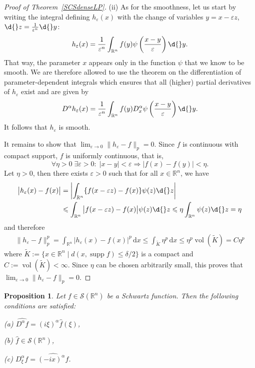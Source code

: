 \documentclass[12pt, oneside, a4paper]{article}
\newtheorem{prop}[thm]{Proposition}
\def\supp{\operatorname{supp}}
\theoremstyle{dfn}
\def \S {\ensuremath{\mathcal{S}}}
\def \S {\ensuremath{\mathcal{S}}}
\def\Rbb{\ensuremath{\mathbb{R}}}
\def\dx{\,\mathrm dx}
\providecommand{\norm}[1]{\lVert#1\rVert}
\providecommand{\abs}[1]{\lvert#1\rvert}
\providecommand{\absbig}[1]{\big\lvert#1\big\rvert}
\providecommand{\Abs}[1]{\left\lvert#1\right\rvert}
\begin{document}
\begin{proof}[Proof of Theorem~\ref{SCSdenseLP}]
(ii) As for the smoothness, let us start by writing the integral defining $h_\varepsilon(x)$ with the change of variables $y = x - \varepsilon z$, $\d{}z = \frac{1}{\varepsilon^n} \d{}y$:
\[
h_\varepsilon(x)
= \frac{1}{\varepsilon^n} \int_{\Rbb^n} f(y) \psi\left(\frac{x-y}{\varepsilon}\right) \d{}y.
\]
That way, the parameter $x$ appears only in the function $\psi$ that we know to be smooth. We are therefore allowed to use the theorem on the differentiation of parameter-dependent integrals which ensures that all (higher) partial derivatives of $h_\varepsilon$ exist and are given by
\[
D^\alpha h_\varepsilon(x)
= \frac{1}{\varepsilon^n} \int_{\Rbb^n} f(y) D^\alpha_x \psi\left(\frac{x-y}{\varepsilon}\right) \d{}y.
\]
It follows that $h_\varepsilon$ is smooth.

It remains to show that $\lim_{\varepsilon \to 0} \norm{h_\varepsilon - f}_p = 0$. Since $f$ is continuous with compact support, $f$ is uniformly continuous, that is,
\[
\forall \eta > 0 \; \exists \varepsilon > 0: \; \abs{x-y} < \varepsilon \Rightarrow \abs{f(x) - f(y)} < \eta.
\]
Let $\eta > 0$, then there exists $\varepsilon > 0$ such that for all $x \in \Rbb^n$, we have
\begin{align*}
	\absbig{h_\varepsilon(x) - f(x)}
	&= \Abs{\int_{\Rbb^n} \{f(x - \varepsilon z) - f(x)\} \psi(z) \d{}z} \\
	&\leqslant \int_{\Rbb^n} \absbig{f(x - \varepsilon z) - f(x)} \psi(z) \d{}z
	\leqslant \eta \int_{\Rbb^n} \psi(z) \d{}z = \eta 
\end{align*}
and therefore
\begin{align*}
	\norm{h_\varepsilon - f}_p^p
	= \int_{\Rbb^n} \absbig{h_\varepsilon(x) - f(x)}^p \dx
	\leqslant \int_{\tilde{K}} \eta^p \dx \leqslant \eta^p \operatorname{vol}(\tilde{K}) = C\eta^p
\end{align*}
where $\tilde{K} := \{x \in \Rbb^n \mid d(x, \supp f) \leqslant \delta/2\}$ is a compact and $C:= \operatorname{vol}(\tilde{K}) < \infty$. Since $\eta$ can be chosen arbitrarily small, this proves that $\lim_{\varepsilon \to 0} \norm{h_\varepsilon - f}_p = 0$.
\end{proof}

\begin{prop}\label{Prop:DifferentiationOfFourierTransform}
Let $f \in \S(\Rbb^n)$ be a Schwartz function. Then the following conditions are satisfied:

(a) $\widehat{D^\alpha f} = (i\xi)^\alpha \widehat{f}(\xi)$,

(b) $\widehat{f} \in \S(\Rbb^n)$,

(c) $D^\alpha_\xi \widehat{f} = \widehat{(-ix)^\alpha f}$.
\end{prop}
\end{document}
